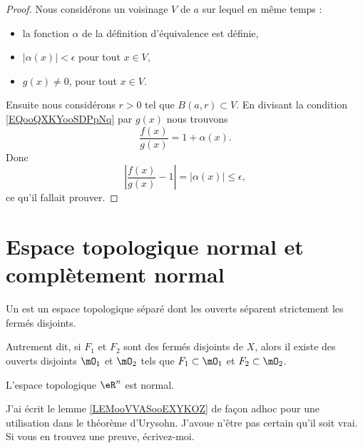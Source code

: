 \begin{proof}
	Nous considérons un voisinage \( V\) de \( a\) sur lequel en même temps :
	\begin{itemize}
		\item
		      la fonction \( \alpha\) de la définition d'équivalence est définie,
		\item
		      \( | \alpha(x) |<\epsilon\) pour tout \( x\in V\),
		\item
		      \( g(x)\neq 0\), pour tout \( x\in V\).
	\end{itemize}
	Ensuite nous considérons \( r>0\) tel que \( B(a,r)\subset V\). En divisant la condition \eqref{EQooQXKYooSDPpNq} par \( g(x)\) nous trouvons
	\begin{equation}
		\frac{ f(x) }{ g(x) }=1+\alpha(x).
	\end{equation}
	Donc
	\begin{equation}
		| \frac{ f(x) }{ g(x) }-1 |=| \alpha(x) |\leq \epsilon,
	\end{equation}
	ce qu'il fallait prouver.
\end{proof}


\section{Espace topologique normal et complètement normal}


\begin{definition}      \label{DEFooNNKVooLtzImT}
	Un  est un espace topologique séparé dont les ouverts séparent strictement les fermés disjoints.

	Autrement dit, si \( F_1\) et \( F_2\) sont des fermés disjoints de \( X\), alors il existe des ouverts disjoints \( \mO_1\) et \( \mO_2\) tels que  \( F_1\subset\mO_1\) et \( F_2\subset \mO_2\).
\end{definition}

\begin{proposition}     \label{PROPooWSKZooHKvuob}
	L'espace topologique \( \eR^n\) est normal.
\end{proposition}

\begin{probleme}		\label{PROPooBYJGooWkbcRo}
	J'ai écrit le lemme \ref{LEMooVVASooEXYKOZ} de façon adhoc pour une utilisation dans le théorème d'Urysohn. J'avoue n'être pas certain qu'il soit vrai. Si vous en trouvez une preuve, écrivez-moi.
\end{probleme}

